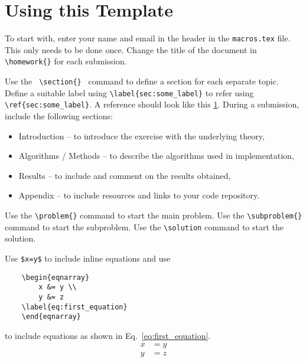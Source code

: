 \documentclass[12pt, a4 paper]{article}
\begin{document}







\section{Using this Template}
\label{sec:some_label}

To start with, enter your name and email in the header in the \verb|macros.tex| file. This only needs to be done once. Change the title of the document in \verb|\homework{}| for each submission.

Use the \verb| \section{} | command to define a section for each separate topic. Define a suitable label using \verb|\label{sec:some_label}| to refer using \verb|\ref{sec:some_label}|. A reference should look like this \ref{sec:some_label}. During a submission, include the following sections:
\begin{itemize}\setlength\itemsep{.1em}
	\item Introduction -- to introduce the exercise with the underlying theory,
	\item Algorithms / Methods -- to describe the algorithms used in implementation,
	\item Results -- to include and comment on the results obtained,
	\item Appendix -- to include resources and links to your code repository.
\end{itemize}

\noindent Use the \verb|\problem{}| command to start the main problem. Use the \verb|\subproblem{}| command to start the subproblem. Use the \verb|\solution| command to start the solution.
\solution

\noindent Use \verb|$x=y$| to include inline equations and use
\begin{verbatim}
	\begin{eqnarray}
		x &= y \\
		y &= z
	\label{eq:first_equation}
	\end{eqnarray}
\end{verbatim}
to include equations as shown in Eq.~\eqref{eq:first_equation}.
\begin{equation}
\begin{split}
	x &= y \\
	y &= z
\end{split}
\label{eq:first_equation}
\end{equation}
\end{document}
